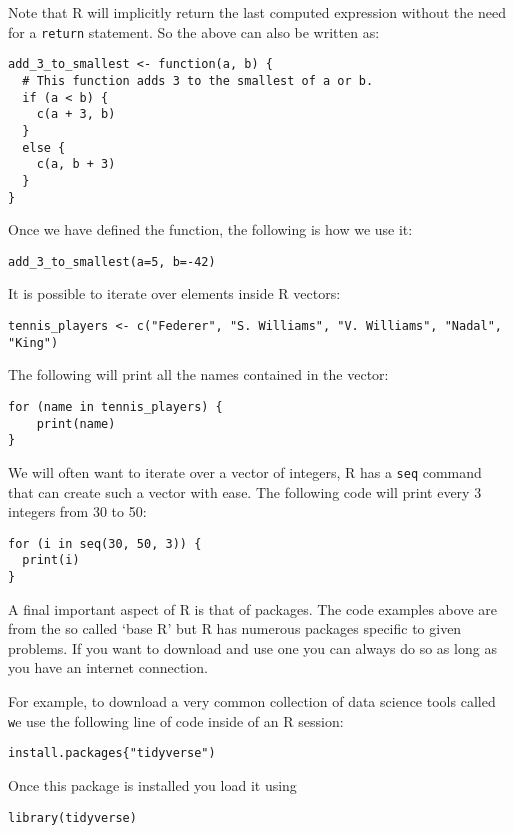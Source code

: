 Note that R will implicitly return the last computed expression without the need
for a \texttt{return} statement. So the above can also be written as:

\begin{verbatim}
add_3_to_smallest <- function(a, b) {
  # This function adds 3 to the smallest of a or b.
  if (a < b) {
    c(a + 3, b)
  }
  else {
    c(a, b + 3)
  }
}
\end{verbatim}

Once we have defined the function, the following is how we use it:

\begin{verbatim}
add_3_to_smallest(a=5, b=-42)
\end{verbatim}

It is possible to iterate over elements inside R vectors:

\begin{verbatim}
tennis_players <- c("Federer", "S. Williams", "V. Williams", "Nadal", "King")
\end{verbatim}

The following will print all the names contained in the vector:

\begin{verbatim}
for (name in tennis_players) {
    print(name)
}
\end{verbatim}

We will often want to iterate over a vector of integers, R has a \texttt
{seq}
command that can create such a vector with ease. The following
code will print every 3 integers from 30 to 50:


\begin{verbatim}
for (i in seq(30, 50, 3)) {
  print(i)
}
\end{verbatim}

A final important aspect of R is that of packages. The code examples above
are from the so called `base R' but R has numerous packages
specific to given problems. If you want to download and use one you can always
do so as long as you have an internet connection.

For example, to download a very common collection of data science tools called
\texttt
we use the following line of code inside of an R session:

\begin{verbatim}
install.packages{"tidyverse")
\end{verbatim}

Once this package is installed you load it using

\begin{verbatim}
library(tidyverse)
\end{verbatim}
